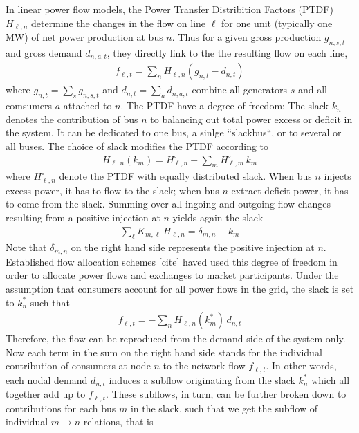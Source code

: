 \documentclass[11pt,twocolumn]{article}
\newcommand{\generation}[1][n]{g_{#1,s,t}}
\newcommand{\nodalgeneration}[1][n]{g_{#1,t}}
\newcommand{\demand}[1][n]{d_{#1,a,t}}
\newcommand{\nodaldemand}[1][n]{d_{#1,t}}
\newcommand{\incidence}[1][n]{K_{#1,\ell}}
\newcommand{\ptdf}[1][n]{H_{\ell,#1}}
\newcommand{\ptdfEqual}[1][n]{\ptdf[#1]^\circ}
\newcommand{\slack}[1][n]{k_{#1}}
\newcommand{\slackk}[1][n]{k^*_{#1}}
\newcommand{\flow}{f_{\ell,t}}
\begin{document}
In linear power flow models, the Power Transfer Distribition Factors (PTDF) $\ptdf$ determine the changes in the flow on line $\ell$ for one unit (typically one MW) of net power production at bus $n$. Thus for a given gross production $\generation$ and gross demand $\demand$, they directly link to the the resulting flow on each line, 
\begin{align}
 \flow  =   \sum_n \ptdf  \left( \nodalgeneration- \nodaldemand \right)    
 \label{eq:flow_from_ptdf}
\end{align}
where $\nodalgeneration = \sum_s \generation$ and $\nodaldemand = \sum_a \demand$ combine all generators $s$ and all comsumers $a$ attached to $n$.
The PTDF have a degree of freedom: The slack $\slack$ denotes the contribution of bus $n$ to balancing out total power excess or deficit in the system. It can be dedicated to one bus, a sinlge ``slackbus``, or to several or all buses. The choice of slack modifies the PTDF according to 
\begin{align}
 \ptdf\left( \slack[m]\right)  = \ptdfEqual - \sum_m \ptdfEqual[m]  \, \slack[m]
 \label{eq:ptdf_slacked}
\end{align}
where $\ptdfEqual$ denote the PTDF with equally distributed slack.
When bus $n$ injects excess power, it has to flow to the slack; when bus $n$ extract deficit power, it has to come from the slack. Summing over all ingoing and outgoing flow changes resulting from a positive injection at $n$ yields again the slack 
\begin{align}
\sum_\ell \incidence[m] \, \ptdf =  \delta_{m,n} - \slack[m] 
\label{eq:slack}
\end{align}
Note that $\delta_{m,n}$ on the right hand side represents the positive injection at $n$.
Established flow allocation schemes [cite] haved used this degree of freedom in order to allocate power flows and exchanges to market participants. Under the assumption that consumers account for all power flows in the grid, the slack is set to $\slack^*$ such that 
\begin{align}
 \flow  = - \sum_n \ptdf\left( \slackk[m]\right) \, \nodaldemand  
 \label{eq:flow_from_demand}
\end{align}
Therefore, the flow can be reproduced from the demand-side of the system only. Now each term in the sum on the right hand side stands for the individual contribution of consumers at node $n$ to the network flow $\flow$. In other words, each nodal demand $\nodaldemand$ induces a subflow originating from the slack $\slackk$ which all together add up to $\flow$. These subflows, in turn, can be further broken down to contributions for each bus $m$ in the slack, such that we get the subflow of individual $m \rightarrow n$ relations, that is 
\end{document}
